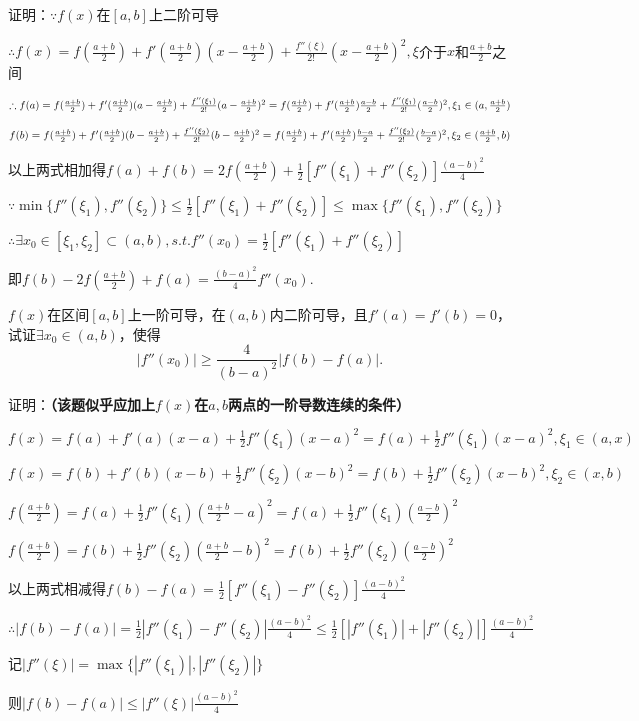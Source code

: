 \documentclass[12pt,UTF8]{ctexart}
\begin{document}
\begin{enumerate}
证明：$\because f(x)$在$[a,b]$上二阶可导

$\therefore f(x)=f(\frac{a+b}2)+f'(\frac{a+b}2)(x-\frac{a+b}2)+\frac{f''(\xi)}{2!}(x-\frac{a+b}2)^2,\xi$介于$x$和$\frac{a+b}2$之间

$\therefore f(a)=f(\frac{a+b}2)+f'(\frac{a+b}2)(a-\frac{a+b}2)+\frac{f''(\xi_1)}{2!}(a-\frac{a+b}2)^2\\
=f(\frac{a+b}2)+f'(\frac{a+b}2)\frac{a-b}2+\frac{f''(\xi_1)}{2!}(\frac{a-b}2)^2,\xi_1\in(a,\frac{a+b}2)$

$f(b)=f(\frac{a+b}2)+f'(\frac{a+b}2)(b-\frac{a+b}2)+\frac{f''(\xi_2)}{2!}(b-\frac{a+b}2)^2\\
=f(\frac{a+b}2)+f'(\frac{a+b}2)\frac{b-a}2+\frac{f''(\xi_2)}{2!}(\frac{b-a}2)^2,\xi_2\in(\frac{a+b}2,b)$

以上两式相加得$f(a)+f(b)=2f(\frac{a+b}2)+\frac12[f''(\xi_1)+f''(\xi_2)]\frac{(a-b)^2}4$

$\because\min\{f''(\xi_1),f''(\xi_2)\}\leq\frac12[f''(\xi_1)+f''(\xi_2)]\leq\max\{f''(\xi_1),f''(\xi_2)\}$

$\therefore\exists x_0\in[\xi_1,\xi_2]\subset(a,b),s.t.f''(x_0)=\frac12[f''(\xi_1)+f''(\xi_2)]$

即$f(b)-2f(\frac{a+b}2)+f(a)=\frac{(b-a)^2}4f''(x_0)$.

$f(x)$在区间$[a,b]$上一阶可导，在$(a,b)$内二阶可导，且$f'(a)=f'(b)=0$，试证$\exists x_0\in(a,b)$，使得
\[
|f''(x_0)|\geq\frac4{(b-a)^2}|f(b)-f(a)|.
\]

证明：{\bf（该题似乎应加上$f(x)$在$a,b$两点的一阶导数连续的条件）}

$f(x)=f(a)+f'(a)(x-a)+\frac12f''(\xi_1)(x-a)^2=f(a)+\frac12f''(\xi_1)(x-a)^2,\xi_1\in(a,x)$

$f(x)=f(b)+f'(b)(x-b)+\frac12f''(\xi_2)(x-b)^2=f(b)+\frac12f''(\xi_2)(x-b)^2,\xi_2\in(x,b)$

$f(\frac{a+b}2)=f(a)+\frac12f''(\xi_1)(\frac{a+b}2-a)^2=f(a)+\frac12f''(\xi_1)(\frac{a-b}2)^2$

$f(\frac{a+b}2)=f(b)+\frac12f''(\xi_2)(\frac{a+b}2-b)^2=f(b)+\frac12f''(\xi_2)(\frac{a-b}2)^2$

以上两式相减得$f(b)-f(a)=\frac12[f''(\xi_1)-f''(\xi_2)]\frac{(a-b)^2}4$

$\therefore|f(b)-f(a)|=\frac12|f''(\xi_1)-f''(\xi_2)|\frac{(a-b)^2}4\leq\frac12[|f''(\xi_1)|+|f''(\xi_2)|]\frac{(a-b)^2}4$

记$|f''(\xi)|=\max\{|f''(\xi_1)|,|f''(\xi_2)|\}$

则$|f(b)-f(a)|\leq |f''(\xi)|\frac{(a-b)^2}4$


\end{enumerate}
\end{document}
